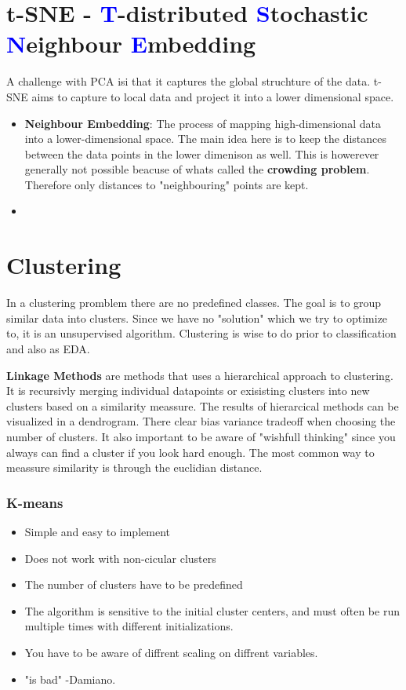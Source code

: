 \section{t-SNE - \textcolor{blue}{T}-distributed \textcolor{blue}{S}tochastic \textcolor{blue}{N}eighbour \textcolor{blue}{E}mbedding}
A challenge with PCA isi that it captures the global struchture of the data. t-SNE aims to capture to local data and project it into a lower dimensional space.
\begin{itemize}
    \item \textbf{Neighbour Embedding}: The process of mapping high-dimensional data into a lower-dimensional space. The main idea here is to keep the distances between the data points in the lower dimenison as well. This is howerever generally not possible beacuse of whats called the \textbf{crowding problem}. Therefore only distances to "neighbouring" points are kept.
    \item 
\end{itemize}

\section{Clustering}
In a clustering promblem there are no predefined classes. The goal is to group similar data into clusters. Since we have no "solution" which we try to optimize to, it is an unsupervised algorithm. Clustering is wise to do prior to classification and also as EDA.

\textbf{Linkage Methods} are methods that uses a hierarchical approach to clustering. It is recursivly merging individual datapoints or exisisting clusters into new clusters based on a similarity meassure. The results of hierarcical methods can be visualized in a dendrogram. There clear bias variance tradeoff when choosing the number of clusters. It also important to be aware of "wishfull thinking" since you always can find a cluster if you look hard enough. The most common way to meassure similarity is through the euclidian distance. \newline

\subsubsection{K-means}
\begin{itemize}
    \item Simple and easy to implement
    \item Does not work with non-cicular clusters
    \item The number of clusters have to be predefined
    \item The algorithm is sensitive to the initial cluster centers, and must often be run multiple times with different initializations.
    \item You have to be aware of diffrent scaling on diffrent variables.
    \item "is bad" -Damiano.
\end{itemize}

